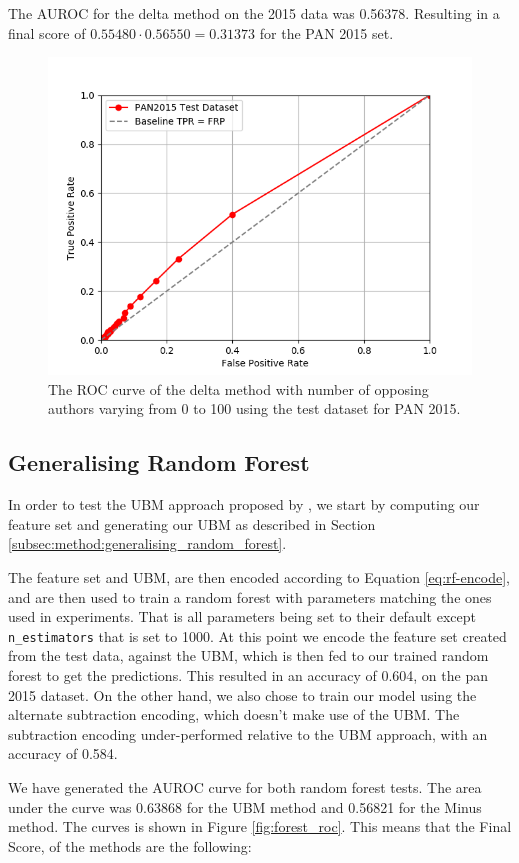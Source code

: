 The \gls{AUROC} for the delta method on the 2015 data was 0.56378. Resulting
in a final score of $0.55480 \cdot 0.56550 = 0.31373$ for the PAN 2015 set.

\begin{figure}
    \centering
    \includegraphics[width=.7\textwidth]{./pictures/delta_method_roc.png}
    \caption{The ROC curve of the delta method with number of opposing authors
    varying from 0 to 100 using the test dataset for PAN 2015.}
    \label{fig:delta_method_roc}
\end{figure}

\subsection{Generalising Random Forest} \label{subsec:results:generalising_random_forest}
In order to test the \gls{UBM} approach proposed by \cite{pacheco2015}, we start
by computing our feature set and generating our \gls{UBM} as described in
Section \ref{subsec:method:generalising_random_forest}.

The feature set and \gls{UBM}, are then encoded according to Equation
\eqref{eq:rf-encode}, and are then used to train a random forest with parameters
matching the ones used in experiments. That is all parameters being set to their
default except \texttt{n\_estimators} that is set to 1000. At this point we
encode the feature set created from the test data, against the \gls{UBM}, which
is then fed to our trained random forest to get the predictions. This resulted
in an accuracy of 0.604, on the pan 2015 dataset. On the other hand, we also
chose to train our model using the alternate subtraction encoding, which doesn't
make use of the \gls{UBM}. The subtraction encoding under-performed relative to
the \gls{UBM} approach, with an accuracy of 0.584.

We have generated the \gls{AUROC} curve for both random forest tests. The area
under the curve was 0.63868 for the \gls{UBM} method and 0.56821 for the Minus
method. The curves is shown in Figure \ref{fig:forest_roc}. 
This means that the Final Score, of the methods are the following:


